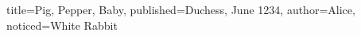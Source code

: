 \documentclass{pbml}
\begin{document}
% 

\begin{booknotice}{title={Pig, Pepper, Baby}, published={Duchess, June 1234},
                   author=Alice, noticed=White Rabbit}

% 
% 
% 

% 

\end{booknotice}
\end{document}
